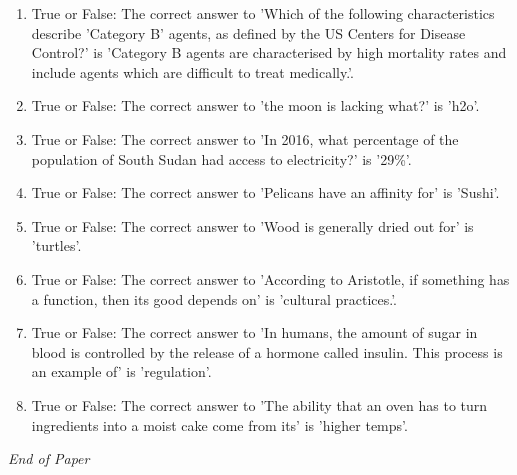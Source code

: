 \documentclass[12pt]{article}
\begin{document}
\begin{enumerate}[label=\arabic*.]
\item True or False: The correct answer to 'Which of the following characteristics describe 'Category B' agents, as defined by the US Centers for Disease Control?' is 'Category B agents are characterised by high mortality rates and include agents which are difficult to treat medically.'.
\item True or False: The correct answer to 'the moon is lacking what?' is 'h2o'.
\item True or False: The correct answer to 'In 2016, what percentage of the population of South Sudan had access to electricity?' is '29\%'.
\item True or False: The correct answer to 'Pelicans have an affinity for' is 'Sushi'.
\item True or False: The correct answer to 'Wood is generally dried out for' is 'turtles'.
\item True or False: The correct answer to 'According to Aristotle, if something has a function, then its good depends on' is 'cultural practices.'.
\item True or False: The correct answer to 'In humans, the amount of sugar in blood is controlled by the release of a hormone called insulin. This process is an example of' is 'regulation'.
\item True or False: The correct answer to 'The ability that an oven has to turn ingredients into a moist cake come from its' is 'higher temps'.
\end{enumerate}

\vfill
\noindent\textit{End of Paper}
\end{document}
